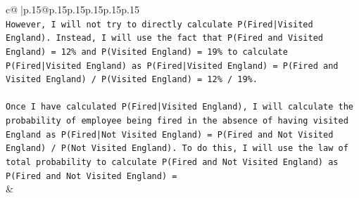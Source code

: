 \documentclass{article}
\begin{document}
{\begin{supertabular}{c@{$\;$}|p{.15\linewidth}@{}p{.15\linewidth}p{.15\linewidth}p{.15\linewidth}p{.15\linewidth}p{.15\linewidth}}
{{{\\ 
\texttt{However, I will not try to directly calculate P(Fired|Visited England). Instead, I will use the fact that P(Fired and Visited England) = 12\% and P(Visited England) = 19\% to calculate P(Fired|Visited England) as P(Fired|Visited England) = P(Fired and Visited England) / P(Visited England) = 12\% / 19\%. } \\
\\ 
\texttt{Once I have calculated P(Fired|Visited England), I will calculate the probability of employee being fired in the absence of having visited England as P(Fired|Not Visited England) = P(Fired and Not Visited England) / P(Not Visited England). To do this, I will use the law of total probability to calculate P(Fired and Not Visited England) as P(Fired and Not Visited England) =} \\
            }
        }
    }
    & \\ \\

\end{supertabular}
}
\end{document}
